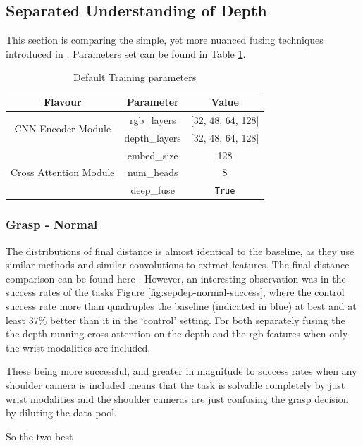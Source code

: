 \subsection{Separated Understanding of Depth}
This section is comparing the simple, yet more nuanced fusing techniques introduced in . Parameters set can be found in Table \ref{tab:sep-dep-params}.

\begin{table}[H]
\centering
  \begin{tabular}{|| c | c | c ||}
  \hline
  Flavour & Parameter & Value \\
  \hline
  
  \multirow{2}{*}{CNN Encoder Module} & rgb\_layers & [32, 48, 64, 128] \\
  & depth\_layers & [32, 48, 64, 128] \\
  \hline
  \multirow{3}{*}{Cross Attention Module} & embed\_size & 128 \\
  & num\_heads & 8 \\
  & deep\_fuse & \texttt{True} \\
  \hline
  \end{tabular}\caption{Default Training parameters}\label{tab:sep-dep-params}
\end{table}

\subsubsection{Grasp - Normal}
The distributions of final distance is almost identical to the baseline, as they use similar methods and similar convolutions to extract features. The final distance comparison can be found here . However, an interesting observation was in the success rates of the tasks Figure \ref{fig:sepdep-normal-success}, where the control success rate more than quadruples the baseline (indicated in blue) at best and at least 37\% better than it in the `control' setting. For both separately fusing the the depth running cross attention on the depth and the rgb features when only the wrist modalities are included.

These being more successful, and greater in magnitude to success rates when any shoulder camera is included means that the task is solvable completely by just wrist modalities and the shoulder cameras are just confusing the grasp decision by diluting the data pool.

So the two best 


